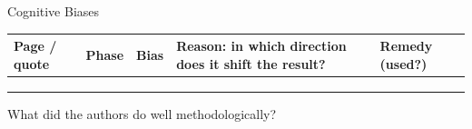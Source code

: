 \begin{uebungsblatt}{Cognitive Biases}
\begin{center}
\small
\renewcommand{\arraystretch}{2.6}
\begin{tabular}{|p{}|p{}|p{}|p{}|p{}|}
\hline
\textbf{Page / quote} & \textbf{Phase} & \textbf{Bias} & \textbf{Reason: in which direction does it shift the result?} & \textbf{Remedy (used?)} \\
\hline
 & & & & \\ \hline
 & & & & \\ \hline
 & & & & \\ \hline
\end{tabular}
\end{center}

What did the authors do well methodologically?
\end{uebungsblatt}


